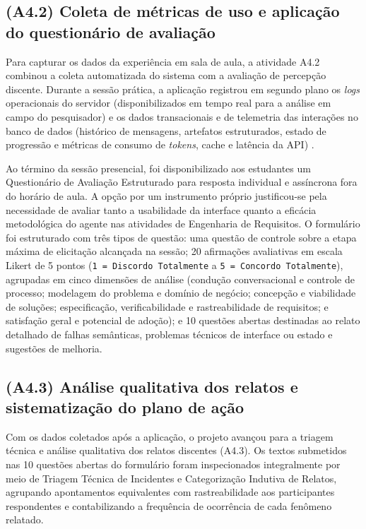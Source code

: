 \subsection{(A4.2) Coleta de métricas de uso e aplicação do questionário de avaliação}

Para capturar os dados da experiência em sala de aula, a atividade A4.2 combinou a coleta automatizada do sistema com a avaliação de percepção discente. Durante a sessão prática, a aplicação registrou em segundo plano os \textit{logs} operacionais do servidor (disponibilizados em tempo real para a análise em campo do pesquisador) e os dados transacionais e de telemetria das interações no banco de dados (histórico de mensagens, artefatos estruturados, estado de progressão e métricas de consumo de \textit{tokens}, cache e latência da API) \cite{pressman2021}.

Ao término da sessão presencial, foi disponibilizado aos estudantes um Questionário de Avaliação Estruturado para resposta individual e assíncrona fora do horário de aula. A opção por um instrumento próprio justificou-se pela necessidade de avaliar tanto a usabilidade da interface quanto a eficácia metodológica do agente nas atividades de Engenharia de Requisitos. O formulário foi estruturado com três tipos de questão: uma questão de controle sobre a etapa máxima de elicitação alcançada na sessão; 20 afirmações avaliativas em escala Likert de 5 pontos (\texttt{1 = Discordo Totalmente} a \texttt{5 = Concordo Totalmente}), agrupadas em cinco dimensões de análise (condução conversacional e controle de processo; modelagem do problema e domínio de negócio; concepção e viabilidade de soluções; especificação, verificabilidade e rastreabilidade de requisitos; e satisfação geral e potencial de adoção); e 10 questões abertas destinadas ao relato detalhado de falhas semânticas, problemas técnicos de interface ou estado e sugestões de melhoria.

\subsection{(A4.3) Análise qualitativa dos relatos e sistematização do plano de ação}

Com os dados coletados após a aplicação, o projeto avançou para a triagem técnica e análise qualitativa dos relatos discentes (A4.3). Os textos submetidos nas 10 questões abertas do formulário foram inspecionados integralmente por meio de Triagem Técnica de Incidentes e Categorização Indutiva de Relatos, agrupando apontamentos equivalentes com rastreabilidade aos participantes respondentes e contabilizando a frequência de ocorrência de cada fenômeno relatado.

